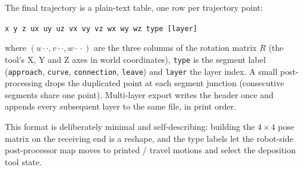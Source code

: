 The final trajectory is a plain-text table, one row per trajectory
point:
\begin{center}
\texttt{x y z ux uy uz vx vy vz wx wy wz type [layer]}
\end{center}
where $(u\!\cdot\!\cdot, v\!\cdot\!\cdot, w\!\cdot\!\cdot)$ are the
three columns of the rotation matrix $R$ (the tool's X, Y and Z axes
in world coordinates), \texttt{type} is the segment label
(\texttt{approach}, \texttt{curve}, \texttt{connection},
\texttt{leave}) and \texttt{layer} the layer index. A small
post-processing drops the duplicated point at each segment junction
(consecutive segments share one point). Multi-layer export writes the
header once and appends every subsequent layer to the same file, in
print order.

This format is deliberately minimal and self-describing: building the
$4\times 4$ pose matrix on the receiving end is a reshape, and the
type labels let the robot-side post-processor map moves to printed /
travel motions and select the deposition tool state.

